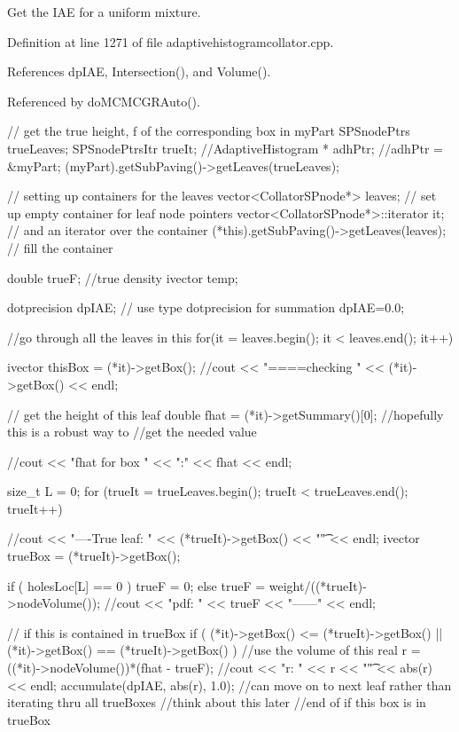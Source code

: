 \-Get the \-I\-A\-E for a uniform mixture. 

\-Definition at line 1271 of file adaptivehistogramcollator.\-cpp.



\-References dp\-I\-A\-E, \-Intersection(), and \-Volume().



\-Referenced by do\-M\-C\-M\-C\-G\-R\-Auto().


\begin{DoxyCode}
{                                               
   // get the true height, f of the corresponding box in myPart
  SPSnodePtrs trueLeaves;
  SPSnodePtrsItr trueIt;
  //AdaptiveHistogram * adhPtr;
  //adhPtr = &myPart;
  (myPart).getSubPaving()->getLeaves(trueLeaves);

  // setting up containers for the leaves
  vector<CollatorSPnode*> leaves; // set up empty container for leaf node
       pointers
  vector<CollatorSPnode*>::iterator it; // and an iterator over the container
  (*this).getSubPaving()->getLeaves(leaves); // fill the container

  double trueF; //true density
  ivector temp;
  
   dotprecision dpIAE;    // use type dotprecision for summation  
   dpIAE=0.0;

  
  //go through all the leaves in this
  for(it = leaves.begin(); it < leaves.end(); it++) {
    ivector thisBox = (*it)->getBox();
    //cout << "====checking " << (*it)->getBox() << endl;
      
    // get the height of this leaf
    double fhat = (*it)->getSummary()[0]; //hopefully this is a robust way to
                              //get the needed value
    
    //cout << "fhat for box " << ":" << fhat << endl;

    size_t L = 0;
    for (trueIt = trueLeaves.begin(); trueIt < trueLeaves.end(); trueIt++) {
      //cout << "----True leaf: " << (*trueIt)->getBox() << "\t" << endl;
      ivector trueBox = (*trueIt)->getBox();

      if (  holesLoc[L] == 0 ) { trueF = 0; }
      else { trueF = weight/((*trueIt)->nodeVolume()); }
      //cout << "pdf: " << trueF << "------" << endl;
      
      // if this is contained in trueBox
      if ( (*it)->getBox() <= (*trueIt)->getBox() || (*it)->getBox() == 
      (*trueIt)->getBox() ) {
        //use the volume of this
        real r = ((*it)->nodeVolume())*(fhat - trueF);
        //cout << "r: " << r << "\t" << abs(r) << endl;
        accumulate(dpIAE, abs(r), 1.0);
        //can move on to next leaf rather than iterating thru all trueBoxes
        //think about this later
      } //end of if this box is in trueBox
      
}}}
\end{DoxyCode}
